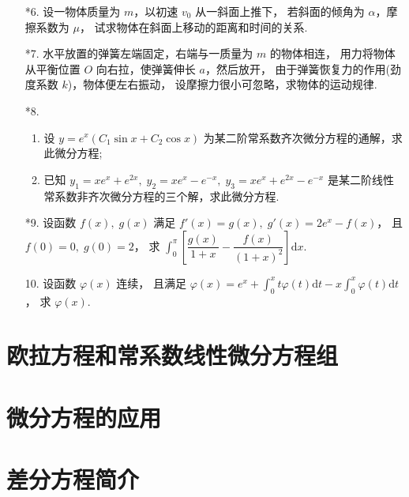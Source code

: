\begin{enumerate}
    \item[*6.] 设一物体质量为 $m$，以初速 $v_0$ 从一斜面上推下，
    若斜面的倾角为 $\alpha$，摩擦系数为 $\mu$，
    试求物体在斜面上移动的距离和时间的关系.

    \item[*7.] 水平放置的弹簧左端固定，右端与一质量为 $m$ 的物体相连，
    用力将物体从平衡位置 $O$ 向右拉，使弹簧伸长 $a$，然后放开，
    由于弹簧恢复力的作用(劲度系数 $k$)，物体便左右振动，
    设摩擦力很小可忽略，求物体的运动规律.

    \item[*8.]
    \begin{enumerate}[(1)]\setlength{\itemsep}{5pt}\setlength{\topsep}{15pt}
        \item 设 $y=e^x(C_1\sin x+C_2\cos x)$ 为某二阶常系数齐次微分方程的通解，求此微分方程;
        \item 已知 $y_1=xe^x+e^{2x},\;y_2=xe^x-e^{-x},\;y_3=xe^x+e^{2x}-e^{-x}$ 
        是某二阶线性常系数非齐次微分方程的三个解，求此微分方程.
    \end{enumerate}

    \item[*9.] 设函数 $f(x),\;g(x)$ 满足 $f'(x)=g(x),\;g'(x)=2e^x-f(x)$，
    且 $f(0)=0,\;g(0)=2$，
    求 $\displaystyle\int_0^{\pi}\left[\dfrac{g(x)}{1+x}-\dfrac{f(x)}{(1+x)^2}\right]\text{d}x$.

    \item[10.] 设函数 $\varphi(x)$ 连续，
    且满足 $\displaystyle\varphi(x)=e^x+\int_0^xt\varphi(t)\text{d}t-x\int_0^x\varphi(t)\text{d}t$，
    求 $\varphi(x)$.

\end{enumerate}

\section{欧拉方程和常系数线性微分方程组}


\section{微分方程的应用}


\section{差分方程简介}

